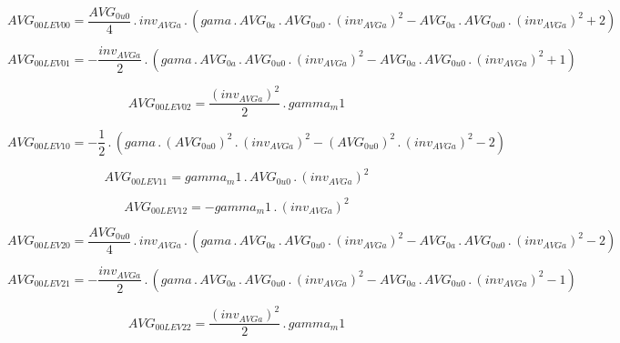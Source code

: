 \documentclass{article}
\begin{document}
\begin{dmath}AVG_{0 0 LEV 00} = \frac{AVG_{0 u0}}{4} \,.\, inv_{AVG a} \,.\, \left(gama \,.\, AVG_{0 a} \,.\, AVG_{0 u0} \,.\, \left(inv_{AVG a} \right)^{2} - AVG_{0 a} \,.\, AVG_{0 u0} \,.\, \left(inv_{AVG a} \right)^{2} + 2\right)\end{dmath}

\begin{dmath}AVG_{0 0 LEV 01} = - \frac{inv_{AVG a}}{2} \,.\, \left(gama \,.\, AVG_{0 a} \,.\, AVG_{0 u0} \,.\, \left(inv_{AVG a} \right)^{2} - AVG_{0 a} \,.\, AVG_{0 u0} \,.\, \left(inv_{AVG a} \right)^{2} + 1\right)\end{dmath}

\begin{dmath}AVG_{0 0 LEV 02} = \frac{\left(inv_{AVG a} \right)^{2}}{2} \,.\, gamma_m1\end{dmath}

\begin{dmath}AVG_{0 0 LEV 10} = - \frac{1}{2} \,.\, \left(gama \,.\, \left(AVG_{0 u0} \right)^{2} \,.\, \left(inv_{AVG a} \right)^{2} - \left(AVG_{0 u0} \right)^{2} \,.\, \left(inv_{AVG a} \right)^{2} - 2\right)\end{dmath}

\begin{dmath}AVG_{0 0 LEV 11} = gamma_m1 \,.\, AVG_{0 u0} \,.\, \left(inv_{AVG a} \right)^{2}\end{dmath}

\begin{dmath}AVG_{0 0 LEV 12} = - gamma_m1 \,.\, \left(inv_{AVG a} \right)^{2}\end{dmath}

\begin{dmath}AVG_{0 0 LEV 20} = \frac{AVG_{0 u0}}{4} \,.\, inv_{AVG a} \,.\, \left(gama \,.\, AVG_{0 a} \,.\, AVG_{0 u0} \,.\, \left(inv_{AVG a} \right)^{2} - AVG_{0 a} \,.\, AVG_{0 u0} \,.\, \left(inv_{AVG a} \right)^{2} - 2\right)\end{dmath}

\begin{dmath}AVG_{0 0 LEV 21} = - \frac{inv_{AVG a}}{2} \,.\, \left(gama \,.\, AVG_{0 a} \,.\, AVG_{0 u0} \,.\, \left(inv_{AVG a} \right)^{2} - AVG_{0 a} \,.\, AVG_{0 u0} \,.\, \left(inv_{AVG a} \right)^{2} - 1\right)\end{dmath}

\begin{dmath}AVG_{0 0 LEV 22} = \frac{\left(inv_{AVG a} \right)^{2}}{2} \,.\, gamma_m1\end{dmath}
\end{document}
